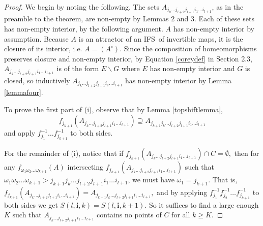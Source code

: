 \documentclass{amsproc}%
\theoremstyle{plain}
\theoremstyle{definition}
\numberwithin{equation}{section}
\begin{document}
\begin{proof}
We begin by noting the following. The sets $A_{j_{k}\dots j_{l+2}j_{l+1}%
i_{1}\dots i_{l+1}}$, as in the preamble to the theorem, are non-empty by
Lemmas 2 and 3. Each of these sets has non-empty interior, by the following
argument. $A$ has non-empty interior by assumption. Because $A$ is an
attractor of an IFS\ of invertible maps, it is the closure of its interior,
i.e. $A=\overline{(A^{\circ})}$. Since the composition of homeomorphisms
preserves closure and non-empty interior, by Equation \ref{coreydef} in
Section 2.3, $A_{j_{k}\dots j_{l+2}j_{l+1}i_{1}\dots i_{l+1}}$ is of the form
$E\backslash G$ where $E$ has non-empty interior and $G$ is closed, so
inductively $A_{j_{k}\dots j_{l+2}j_{l+1}i_{1}\dots i_{l+1}}$ has non-empty
interior by Lemma \ref{lemmafour}.

To prove the first part of (i), observe that by Lemma \ref{topshiftlemma},
\[
f_{j_{k+1}}(A_{j_{k}\dots j_{l+2}j_{l+1}i_{1}\dots i_{l+1}})\supseteq
A_{j_{k+1}j_{k}\dots j_{l+2}j_{l+1}i_{1}\dots i_{l+1}}%
\]
and apply $f_{j_{1}}^{-1}\dots f_{j_{k+1}}^{-1}$ to both sides.

For the remainder of (i), notice that if $f_{j_{k+1}}(A_{j_{k}\dots
j_{l+2}j_{l+1}i_{1}\dots i_{l+1}})\cap C=\emptyset,$ then for any
$f_{\omega_{1}\omega_{2}\dots\omega_{k+1}}(A)$ intersecting $f_{j_{k+1}%
}(A_{j_{k}\dots j_{l+2}j_{l+1}i_{1}\dots i_{l+1}})$ such that $\omega
_{1}\omega_{2}\dots\omega_{k+1}>j_{k+1}j_{k}\dots j_{l+2}j_{l+1}i_{1}\dots
i_{l+1}$, we must have $\omega_{1}=j_{k+1}$. That is, $f_{j_{k+1}}%
(A_{j_{k}\dots j_{l+2}j_{l+1}i_{1}\dots i_{l+1}})=A_{j_{k+1}j_{k}\dots
j_{l+2}j_{l+1}i_{1}\dots i_{l+1}},$ and by applying $f_{j_{1}}^{-1}f_{j_{2}%
}^{-1}\dots f_{j_{k+1}}^{-1}$ to both sides we get $S(l,\mathbf{i,}%
k)=S(l,\mathbf{i,}k+1).$ So it suffices to find a large enough $K$ such that
$A_{j_{k}\dots j_{l+2}j_{l+1}i_{1}\dots i_{l+1}}$ contains no points of $C$
for all $k\geq K$.


\end{proof}
\end{document}
